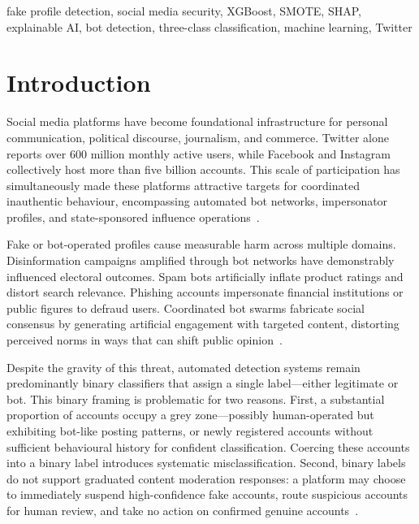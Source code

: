 \documentclass[conference]{IEEEtran}
\begin{document}
\begin{IEEEkeywords}
fake profile detection, social media security, XGBoost, SMOTE,
SHAP, explainable AI, bot detection, three-class classification,
machine learning, Twitter
\end{IEEEkeywords}

\section{Introduction}

Social media platforms have become foundational infrastructure for
personal communication, political discourse, journalism, and commerce.
Twitter alone reports over 600 million monthly active users, while
Facebook and Instagram collectively host more than five billion accounts.
This scale of participation has simultaneously made these platforms
attractive targets for coordinated inauthentic behaviour, encompassing
automated bot networks, impersonator profiles, and state-sponsored
influence operations~\cite{b1}.

Fake or bot-operated profiles cause measurable harm across multiple
domains. Disinformation campaigns amplified through bot networks have
demonstrably influenced electoral outcomes. Spam bots artificially
inflate product ratings and distort search relevance. Phishing accounts
impersonate financial institutions or public figures to defraud users.
Coordinated bot swarms fabricate social consensus by generating
artificial engagement with targeted content, distorting perceived norms
in ways that can shift public opinion~\cite{b2}.

Despite the gravity of this threat, automated detection systems remain
predominantly binary classifiers that assign a single label---either
legitimate or bot. This binary framing is problematic for two
reasons. First, a substantial proportion of accounts occupy a grey
zone---possibly human-operated but exhibiting bot-like posting patterns,
or newly registered accounts without sufficient behavioural history for
confident classification. Coercing these accounts into a binary label
introduces systematic misclassification. Second, binary labels do not
support graduated content moderation responses: a platform may choose
to immediately suspend high-confidence fake accounts, route suspicious
accounts for human review, and take no action on confirmed genuine
accounts~\cite{b8}.
\end{document}
